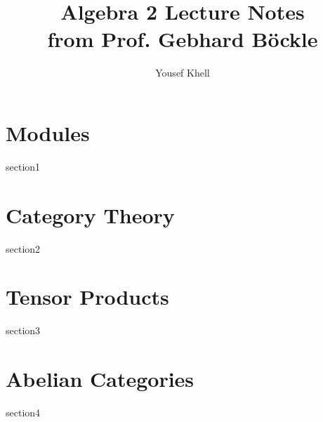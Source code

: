 \documentclass[a4paper]{report}
\title{\vspace{-2cm} Algebra 2 Lecture Notes\\from Prof. Gebhard Böckle}
\author{Yousef Khell}
\begin{document}
\maketitle
\tableofcontents

\chapter{Modules}
{section1}
\chapter{Category Theory}
{section2}
\chapter{Tensor Products}
{section3}
\chapter{Abelian Categories}
{section4}
\end{document}
